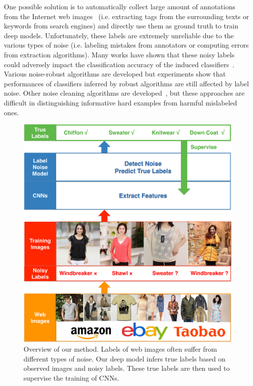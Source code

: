 \documentclass[10pt,twocolumn,letterpaper]{article}
\begin{document}
One possible solution is to automatically collect large amount of annotations from the Internet web images~\cite{gong2014multiview} (i.e. extracting tags from the surrounding texts or keywords from search engines) and directly use them as ground truth to train deep models. Unfortunately, these labels are extremely unreliable due to the various types of noise (i.e. labeling mistakes from annotators or computing errors from extraction algorithms). Many works have shown that these noisy labels could adversely impact the classification accuracy of the induced classifiers~\cite{zhu2004class,nettleton2010study,pechenizkiy2006class}. Various noise-robust algorithms are developed but experiments show that performances of classifiers inferred by robust algorithms are still affected by label noise. Other noise cleaning algorithms are developed~\cite{barandela2000decontamination,brodley2011identifying}, but these approaches are difficult in distinguishing informative hard examples from harmful mislabeled ones. 

\begin{figure}[t]
\begin{center}
\includegraphics[width=0.9\linewidth]{figure/overview.pdf}
\end{center}
\caption{Overview of our method. Labels of web images often suffer from different types of noise. Our deep model infers true labels based on observed images and noisy labels. These true labels are then used to supervise the training of CNNs.}
\label{fig:overview}
\end{figure}
\end{document}
